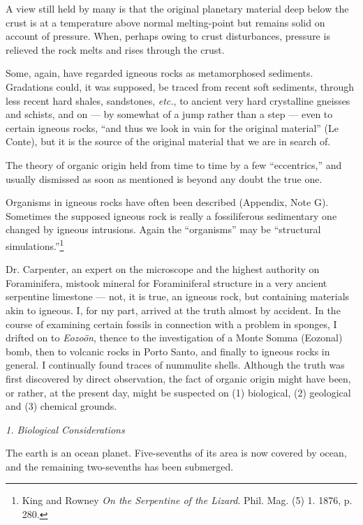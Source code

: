 \documentclass[a4paper, 12pt, oneside, landscape]{article}
\begin{document}
A view still held by many is that the original planetary material deep below the crust is at a temperature above normal melting-point but remains solid on account of pressure. When, perhaps owing to crust disturbances, pressure is relieved the rock melts and rises through the crust.

Some, again, have regarded igneous rocks as metamorphosed sediments. Gradations could, it was supposed, be traced from recent soft sediments, through less recent hard shales, sandstones, \emph{etc.}, to ancient very hard crystalline gneisses and schists, and on --- by somewhat of a jump rather than a step --- even to certain igneous rocks, ``and thus we look in vain for the original material'' (Le Conte), but it is the source of the original material that we are in search of.

The theory of organic origin held from time to time by a few ``eccentrics,'' and usually dismissed as soon as mentioned is beyond any doubt the true one.

Organisms in igneous rocks have often been described (Appendix, Note G). Sometimes the supposed igneous rock is really a fossiliferous sedimentary one changed by igneous intrusions. Again the ``organisms'' may be ``structural simulations.''\footnote{King and Rowney \emph{On the Serpentine of the Lizard}. Phil. Mag. (5) 1. 1876, p. 280.}

Dr. Carpenter, an expert on the microscope and the highest authority on Foraminifera, mistook mineral for Foraminiferal structure in a very ancient serpentine limestone --- not, it is true, an igneous rock, but containing materials akin to igneous. I, for my part, arrived at the truth almost by accident. In the course of examining certain fossils in connection with a problem in sponges, I drifted on to \emph{Eozoön}, thence to the investigation of a Monte Somma (Eozonal) bomb, then to volcanic rocks in Porto Santo, and finally to igneous rocks in general. I continually found traces of nummulite shells. Although the truth was first discovered by direct observation, the fact of organic origin might have been, or rather, at the present day, might be suspected on (1) biological, (2) geological and (3) chemical grounds.

\bigskip
\centerline{\emph{1. Biological Considerations}}

The earth is an ocean planet. Five-sevenths of its area is now covered by ocean, and the remaining two-sevenths has been submerged.
\end{document}
